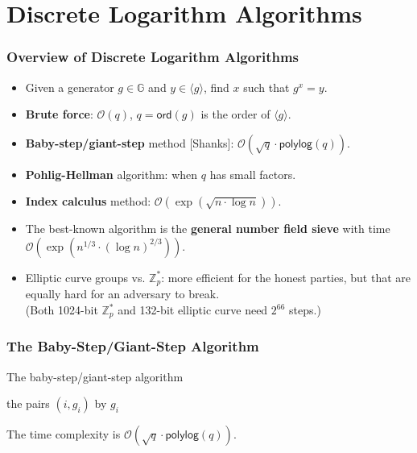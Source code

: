 \section{Discrete Logarithm Algorithms}
\begin{frame}\frametitle{Overview of Discrete Logarithm Algorithms}
\begin{itemize}
\item Given a generator $g \in \mathbb{G}$ and $y \in \langle g \rangle$, find $x$ such that $g^x=y$.
\item \textbf{Brute force}: $\mathcal{O}(q)$, $q = \mathsf{ord}(g)$ is the order of $\langle g\rangle$.
\item \textbf{Baby-step/giant-step} method [Shanks]: $\mathcal{O}(\sqrt{q}\cdot \mathsf{polylog}(q))$.
\item \textbf{Pohlig-Hellman} algorithm: when $q$ has small factors.
\item \textbf{Index calculus} method: $\mathcal{O}(\exp{(\sqrt{n\cdot \log n})})$.
\item The best-known algorithm is the \textbf{general number field sieve} with time $\mathcal{O}(\exp(n^{1/3}\cdot(\log n)^{2/3}))$.
\item Elliptic curve groups vs. $\mathbb{Z}_p^*$: more efficient for the honest parties, but that are equally hard for an adversary to break.\\ (Both 1024-bit $\mathbb{Z}_p^*$ and 132-bit elliptic curve need $2^{66}$ steps.)
\end{itemize}
\end{frame}
\begin{frame}\frametitle{The Baby-Step/Giant-Step Algorithm}
\begin{figure}
\begin{center}

\end{center}
\end{figure}
\begin{algorithm}[H]
\DontPrintSemicolon
\caption{The baby-step/giant-step algorithm}
\BlankLine

\KwS the pairs $(i,g_i)$ by $g_i$\;
\end{algorithm}
The time complexity is $\mathcal{O}(\sqrt{q}\cdot \mathsf{polylog}(q))$.
\end{frame}
